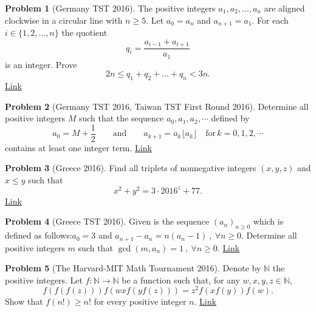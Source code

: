 \documentclass[]{article}
\theoremstyle{definition}
\newtheorem{problem}{Problem}
\begin{document}
\begin{problem}[Germany TST 2016]
	The positive integers $a_1,a_2, \dots, a_n$ are aligned clockwise in a circular line with $n \geq 5$. Let $a_0=a_n$ and $a_{n+1}=a_1$. For each $i \in \{1,2,\dots,n \}$ the quotient \[ q_i=\frac{a_{i-1}+a_{i+1}}{a_1} \]is an integer. Prove \[ 2n \leq q_1+q_2+\dots+q_n < 3n. \] \flushright \href{http://artofproblemsolving.com/community/c6h1269699p6629923}{Link}
\end{problem}



\begin{problem}[Germany TST 2016, Taiwan TST First Round 2016]
	Determine all positive integers $M$ such that the sequence $a_0, a_1, a_2, \cdots$ defined by \[ a_0 = M + \frac{1}{2} \qquad \textrm{and} \qquad a_{k+1} = a_k\lfloor a_k \rfloor \quad \textrm{for} \, k = 0, 1, 2, \cdots \]contains at least one integer term. \hfill \href{http://artofproblemsolving.com/community/c6h1268859p6622268}{Link}
\end{problem}



\begin{problem}[Greece 2016]
	Find all triplets of nonnegative integers $(x,y,z)$ and $x\leq y$ such that
	$$x^2+y^2=3 \cdot 2016^z+77.$$
	\flushright \href{http://artofproblemsolving.com/community/c6h1205284p5947020}{Link}
\end{problem}




\begin{problem}[Greece TST 2016]
	Given is the sequence $(a_n)_{n\geq 0}$ which is defined as follows:$a_0=3$ and $a_{n+1}-a_n=n(a_n-1) \ , \ \forall n\geq 0$. Determine all positive integers $m$ such that $\gcd (m,a_n)=1 \ , \ \forall n\geq 0$. \hfill \href{http://artofproblemsolving.com/community/c6h1269148p6624948}{Link}
\end{problem}



\begin{problem}[The Harvard-MIT Math Tournament 2016]
	Denote by $\mathbb{N}$ the positive integers. Let $f:\mathbb{N} \rightarrow \mathbb{N}$ be a function such that, for any $w,x,y,z \in \mathbb{N}$, \[ f(f(f(z)))f(wxf(yf(z)))=z^{2}f(xf(y))f(w). \]Show that $f(n!) \ge n!$ for every positive integer $n$. \hfill \href{http://artofproblemsolving.com/community/c6h1231859p6230953}{Link}
\end{problem}
\end{document}
